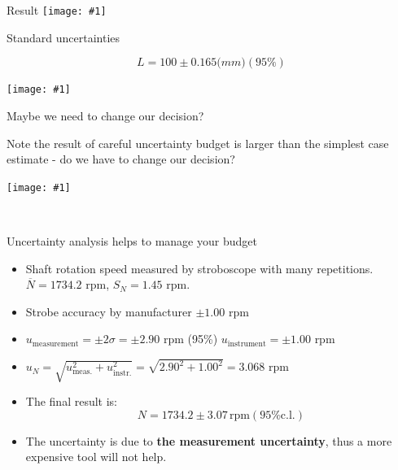 \documentclass[12pt]{beamer}
\newcommand{\fig}[1]{\centering\texttt{[image: \#1]}}
\begin{document}
\begin{frame}{Result}
\fig{Calculating-Combined-Standard-Uncertainty}
\end{frame}
%
\begin{frame}{Standard uncertainties}

\[ L = 100 \pm 0.165 \mathrm(mm) (95\%) \]

\fig{Calculating-standard-uncertainties-with-budget}


\end{frame}

\begin{frame}{Maybe we need to change our decision?}

Note the result of careful uncertainty budget is larger than the simplest case estimate - \alert{do we have to change our decision?}

\fig{two_models_uncertainty}

\end{frame}

\\
\begin{frame}{Uncertainty analysis helps to manage your budget}

\begin{itemize}
\item Shaft rotation speed measured by stroboscope with many
repetitions. $\overline{N}=1734.2$ rpm, $S_{N}=1.45$ rpm. 
\item Strobe accuracy by manufacturer $\pm 1.00$ rpm
\item $u_{\textrm{measurement}}=\pm 2\sigma=\pm 2.90$ rpm (95\%)
$u_{\textrm{instrument}}=\pm1.00$ rpm 
\item $u_{N}=\sqrt{u_{\textrm{meas.}}^{2}+u_{\textrm{instr.}}^{2}}=\sqrt{2.90^{2}+1.00^{2}}=3.068$ rpm 
\item The final result is:
\[
N=1734.2\pm3.07\,\textrm{rpm} (95\% \mathrm{c.l.})
\]
\item The uncertainty is due to {\bf the measurement uncertainty},
thus a more expensive tool will not help. 
\end{itemize}
\end{frame}
\end{document}
